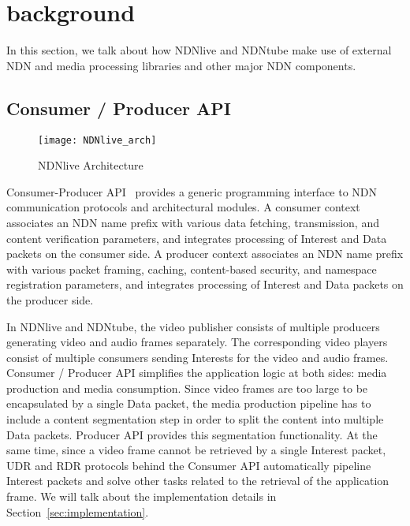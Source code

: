 


\section{background} %
In this section, we talk about how NDNlive and NDNtube make use of external NDN and media processing libraries and other major NDN components. 

\label{sec:background}
\subsection{Consumer / Producer API}
\label{ssub:cpapi}

\begin{figure*}
  \centering
  \texttt{[image: NDNlive\_arch]}
  \caption{NDNlive Architecture}
  \label{fig:NDNlive_arch}
\end{figure*}

Consumer-Producer API~\cite{api-tr}\cite{cp-icn} provides a generic programming interface to NDN communication protocols and architectural modules. A consumer context associates an NDN name prefix with various data fetching, transmission, and content verification parameters, and integrates processing of Interest and Data packets on the consumer side. A producer context associates an NDN name prefix with various packet framing, caching, content-based security, and namespace registration parameters, and integrates processing of Interest and Data packets on the producer side.

In NDNlive and NDNtube, the video publisher consists of multiple producers generating video and audio frames separately. The corresponding video players consist of multiple consumers sending Interests for the video and audio frames. Consumer / Producer API simplifies the application logic at both sides: media production and media consumption. Since video frames are too large to be encapsulated by a single Data packet, the media production pipeline has to include a content segmentation step in order to split the content into multiple Data packets. Producer API provides this segmentation functionality. At the same time, since a video frame cannot be retrieved by a single Interest packet, UDR and RDR protocols behind the Consumer API automatically pipeline Interest packets and solve other tasks related to the retrieval of the application frame. 
We will talk about the implementation details in Section~\ref{sec:implementation}.

